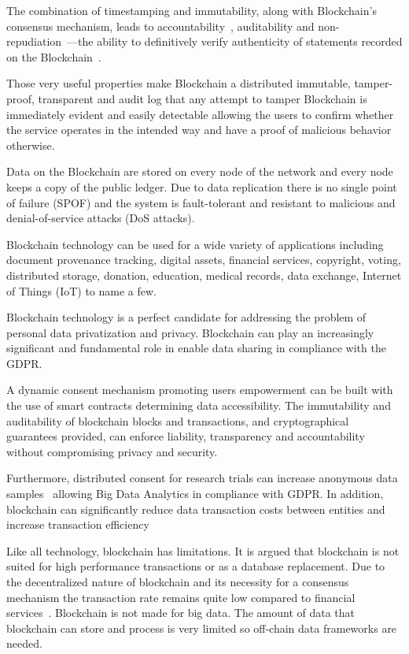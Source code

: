 The combination of timestamping and immutability, along with Blockchain's consensus mechanism, leads to  accountability~\cite{10.1007/978-3-540-46588-1_20}, auditability and non-repudiation~\cite{non_repudiation}---the ability
to definitively verify authenticity of statements recorded on the Blockchain~\cite{bl_auditability}.

Those very useful properties make Blockchain a distributed immutable, tamper-proof, transparent and audit log that any attempt to tamper Blockchain is immediately evident and easily detectable allowing the users to confirm whether the service operates in the intended way and have a proof of malicious behavior otherwise.

Data on the Blockchain are stored on every node of the network and every node keeps a copy of the public ledger. Due to data replication there is no single point of failure (SPOF) and the system is fault-tolerant and resistant to malicious and denial-of-service attacks (DoS attacks).

Blockchain technology can be used for a wide variety of applications including document provenance tracking, digital assets, financial services, copyright, voting, distributed storage, donation, education, medical records, data exchange, Internet of Things (IoT) to name a few.

Blockchain technology is a perfect candidate for addressing the problem of personal data privatization and privacy. Blockchain can play an increasingly significant and fundamental role in enable data sharing in compliance with the GDPR.

A dynamic consent mechanism promoting users empowerment can be built with the use of smart contracts determining data accessibility. The immutability and auditability of blockchain blocks and transactions, and cryptographical guarantees provided, can enforce liability, transparency and accountability without compromising privacy and security.

Furthermore, distributed consent for research trials can increase anonymous data samples~\cite{ibm} allowing Big Data Analytics in compliance with GDPR. In addition, blockchain can significantly reduce data transaction costs between entities and increase transaction efficiency

Like all technology, blockchain has limitations. It is argued that blockchain is not suited for high performance transactions or as a database replacement. Due to the decentralized nature of blockchain and its necessity for a consensus mechanism the transaction rate remains quite low compared to financial services~\cite{Sompolinsky2015, Zohar:2015:BUH:2817191.2701411}. Blockchain is not made for big data. The amount of data that blockchain can store and process is very limited so off-chain data frameworks are needed.

